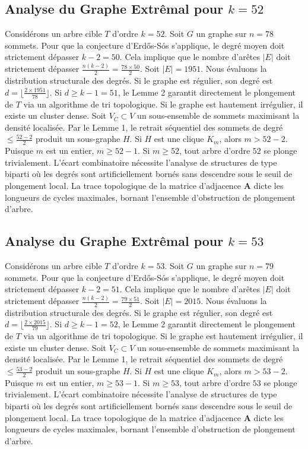 \documentclass[11pt,a4paper]{article}
\begin{document}
\subsection{Analyse du Graphe Extr\^emal pour $k=52$}
Consid\'erons un arbre cible $T$ d'ordre $k=52$.
Soit $G$ un graphe sur $n=78$ sommets.
Pour que la conjecture d'Erd\H{o}s-S\'os s'applique, le degr\'e moyen doit strictement d\'epasser $k-2 = 50$.
Cela implique que le nombre d'ar\^etes $|E|$ doit strictement d\'epasser $\frac{n(k-2)}{2} = \frac{78 \times 50}{2}$.
Soit $|E| = 1951$.
Nous \'evaluons la distribution structurale des degr\'es. Si le graphe est r\'egulier, son degr\'e est $d = \lfloor \frac{2 \times 1951}{78} \rfloor$.
Si $d \geq k-1 = 51$, le Lemme 2 garantit directement le plongement de $T$ via un algorithme de tri topologique.
Si le graphe est hautement irr\'egulier, il existe un cluster dense. Soit $V_C \subset V$ un sous-ensemble de sommets maximisant la densit\'e localis\'ee.
Par le Lemme 1, le retrait s\'equentiel des sommets de degr\'e $\leq \frac{52-2}{2}$ produit un sous-graphe $H$.
Si $H$ est une clique $K_{m}$, alors $m > 52-2$. Puisque $m$ est un entier, $m \geq 52-1$. Si $m \geq 52$, tout arbre d'ordre $52$ se plonge trivialement.
L'\'ecart combinatoire n\'ecessite l'analyse de structures de type biparti o\`u les degr\'es sont artificiellement born\'es sans descendre sous le seuil de plongement local. La trace topologique de la matrice d'adjacence $\mathbf{A}$ dicte les longueurs de cycles maximales, bornant l'ensemble d'obstruction de plongement d'arbre.


\subsection{Analyse du Graphe Extr\^emal pour $k=53$}
Consid\'erons un arbre cible $T$ d'ordre $k=53$.
Soit $G$ un graphe sur $n=79$ sommets.
Pour que la conjecture d'Erd\H{o}s-S\'os s'applique, le degr\'e moyen doit strictement d\'epasser $k-2 = 51$.
Cela implique que le nombre d'ar\^etes $|E|$ doit strictement d\'epasser $\frac{n(k-2)}{2} = \frac{79 \times 51}{2}$.
Soit $|E| = 2015$.
Nous \'evaluons la distribution structurale des degr\'es. Si le graphe est r\'egulier, son degr\'e est $d = \lfloor \frac{2 \times 2015}{79} \rfloor$.
Si $d \geq k-1 = 52$, le Lemme 2 garantit directement le plongement de $T$ via un algorithme de tri topologique.
Si le graphe est hautement irr\'egulier, il existe un cluster dense. Soit $V_C \subset V$ un sous-ensemble de sommets maximisant la densit\'e localis\'ee.
Par le Lemme 1, le retrait s\'equentiel des sommets de degr\'e $\leq \frac{53-2}{2}$ produit un sous-graphe $H$.
Si $H$ est une clique $K_{m}$, alors $m > 53-2$. Puisque $m$ est un entier, $m \geq 53-1$. Si $m \geq 53$, tout arbre d'ordre $53$ se plonge trivialement.
L'\'ecart combinatoire n\'ecessite l'analyse de structures de type biparti o\`u les degr\'es sont artificiellement born\'es sans descendre sous le seuil de plongement local. La trace topologique de la matrice d'adjacence $\mathbf{A}$ dicte les longueurs de cycles maximales, bornant l'ensemble d'obstruction de plongement d'arbre.
\end{document}
